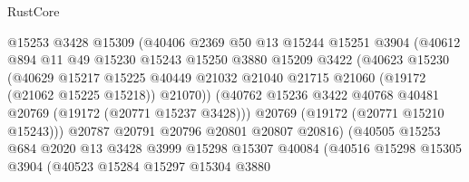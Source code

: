 \begin{lexlean}{RustCore}
\begin{coremodule}
                            @15253
                            @3428
                            @15309
                            (@40406
                              @2369
                              @50
                              @13
                              @15244
                              @15251
                              @3904
                              (@40612
                                @894
                                @11
                                @49
                                @15230
                                @15243
                                @15250
                                @3880
                                @15209
                                @3422
                                (@40623
                                  @15230
                                  (@40629
                                    @15217
                                    @15225
                                    @40449
                                    @21032
                                    @21040
                                    @21715
                                    @21060
                                    (@19172 (@21062 @15225 @15218))
                                    @21070))
                                (@40762
                                  @15236
                                  @3422
                                  @40768
                                  @40481
                                  @20769
                                  (@19172 (@20771 @15237 @3428)))
                                @20769
                                (@19172 (@20771 @15210 @15243)))
                              @20787
                              @20791
                              @20796
                              @20801
                              @20807
                              @20816)
                            (@40505
                              @15253
                              @684
                              @2020
                              @13
                              @3428
                              @3999
                              @15298
                              @15307
                              @40084
                              (@40516
                                @15298
                                @15305
                                @3904
                                (@40523
                                  @15284
                                  @15297
                                  @15304
                                  @3880

\end{coremodule}
\end{lexlean}
